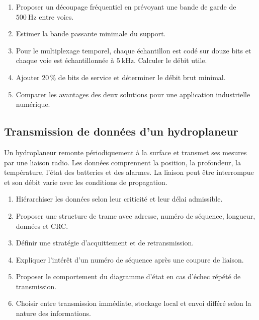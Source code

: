 \begin{enumerate}
  \item Proposer un découpage fréquentiel en prévoyant une bande de garde de $500\ \mathrm{Hz}$ entre voies.
  \item Estimer la bande passante minimale du support.
  \item Pour le multiplexage temporel, chaque échantillon est codé sur douze bits et chaque voie est échantillonnée à $5\ \mathrm{kHz}$. Calculer le débit utile.
  \item Ajouter $20\,\%$ de bits de service et déterminer le débit brut minimal.
  \item Comparer les avantages des deux solutions pour une application industrielle numérique.
\end{enumerate}

\subsection{Transmission de données d'un hydroplaneur}

Un hydroplaneur remonte périodiquement à la surface et transmet ses mesures par une liaison radio. Les données comprennent la position, la profondeur, la température, l'état des batteries et des alarmes. La liaison peut être interrompue et son débit varie avec les conditions de propagation.

\begin{enumerate}
  \item Hiérarchiser les données selon leur criticité et leur délai admissible.
  \item Proposer une structure de trame avec adresse, numéro de séquence, longueur, données et CRC.
  \item Définir une stratégie d'acquittement et de retransmission.
  \item Expliquer l'intérêt d'un numéro de séquence après une coupure de liaison.
  \item Proposer le comportement du diagramme d'état en cas d'échec répété de transmission.
  \item Choisir entre transmission immédiate, stockage local et envoi différé selon la nature des informations.
\end{enumerate}
